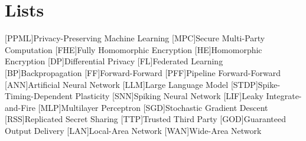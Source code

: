 \chapter{Lists}
{}
\begin{acronym}[\hspace{3cm}]
  [PPML]{Privacy-Preserving Machine Learning}
  [MPC]{Secure Multi-Party Computation}
  [FHE]{Fully Homomorphic Encryption}
  [HE]{Homomorphic Encryption}
  [DP]{Differential Privacy}
  [FL]{Federated Learning}
  [BP]{Backpropagation}
  [FF]{Forward-Forward}
  [PFF]{Pipeline Forward-Forward}
  [ANN]{Artificial Neural Network}
  [LLM]{Large Language Model}
  [STDP]{Spike-Timing-Dependent Plasticity}
  [SNN]{Spiking Neural Network}
  [LIF]{Leaky Integrate-and-Fire}
  [MLP]{Multilayer Perceptron}
  [SGD]{Stochastic Gradient Descent}
  [RSS]{Replicated Secret Sharing}
  [TTP]{Trusted Third Party}
  [GOD]{Guaranteed Output Delivery}
  [LAN]{Local-Area Network}
  [WAN]{Wide-Area Network}
\end{acronym}
\clearpage
{}
\listoffigures
\clearpage
{}
{}
\listoftables
